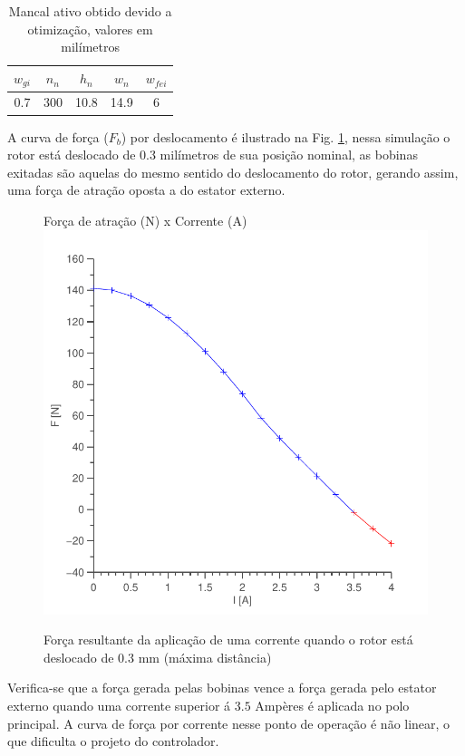 \begin{table}[ht!]
	\centering
	\begin{tabular}{c c c c c}
		 $w_{gi}$ 	& $n_n$ & $h_n$ & $w_n$ & $w_{fei}$  \\ \hline \hline
		 0.7		& 300  	& 10.8 	& 14.9	& 6
	\end{tabular} 
	\caption{Mancal ativo obtido devido a otimização, valores em milímetros}
	\label{tab:ativo:resultado} 
\end{table}

A curva de força ($F_b$) por deslocamento é ilustrado na Fig. \ref{ativo_otimizado_fem_I_dx03}, nessa simulação o rotor está deslocado de 0.3 milímetros de sua posição nominal, as bobinas exitadas são aquelas do mesmo sentido do deslocamento do rotor, gerando assim, uma força de atração oposta a do estator externo.  

\begin{figure}[ht!]
\centering
Força de atração (N) x Corrente (A)
\includegraphics[width=0.8\linewidth]{Figs/Simulacoes/Ativo/ativo_otimizado_fem_I_dx03}
\caption{Força resultante da aplicação de uma corrente quando o rotor está deslocado de 0.3 mm (máxima distância)}
\label{ativo_otimizado_fem_I_dx03}
\end{figure}

Verifica-se que a força gerada pelas bobinas vence a força gerada pelo estator externo quando uma corrente superior á $3.5$ Ampères é aplicada no polo principal. A curva de força por corrente nesse ponto de operação é não linear, o que dificulta o projeto do controlador.

